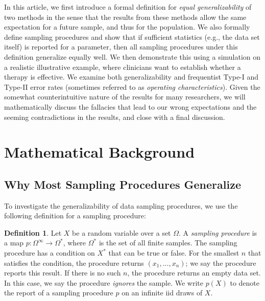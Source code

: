 \documentclass[man]{apa7}
\theoremstyle{definition}
\newtheorem{defn}[thm]{Definition}
\begin{document}
In this article, we first introduce a formal definition for \textit{equal generalizability} of two methods in the sense that the results from these methods allow the same expectation for a future sample, and thus for the population.  We also formally define sampling procedures and show that if sufficient statistics (e.g., the data set itself) is reported for a parameter, then all sampling procedures under this definition generalize equally well. We then demonstrate this using a simulation on a realistic illustrative example, where clinicians want to establish whether a therapy is effective.  We examine both generalizability and frequentist Type-I and Type-II error rates (sometimes referred to as \textit{operating characteristics}).  Given the somewhat counterintuitive nature of the results for many researchers, we will mathematically discuss the fallacies that lead to our wrong expectations and the seeming contradictions in the results, and close with a final discussion. 

\section{Mathematical Background}
\subsection{Why Most Sampling Procedures Generalize}
To investigate the generalizability of data sampling procedures, we use the following definition for a sampling procedure:

\begin{defn}
Let $X$ be a random variable over a set $\Omega$. A \emph{sampling procedure} is a map $p: \Omega^\infty \rightarrow \Omega^*$, where $\Omega^*$ is the set of all finite samples. The sampling procedure has a condition on $X^*$ that can be true or false. For the smallest $n$ that satisfies the condition, the procedure returns $(x_1,...,x_n)$; we say the procedure reports this result. If there is no such $n$, the procedure returns an empty data set. In this case, we say the procedure \emph{ignores} the sample. We write $p(X)$ to denote the report of a sampling procedure $p$ on an infinite iid draws of $X$.
\end{defn}
\end{document}
